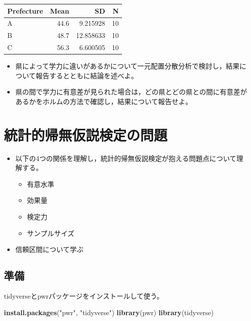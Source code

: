 \documentclass[]{article}
\newenvironment{Shaded}{\begin{snugshade}}{\end{snugshade}}
\newcommand{\KeywordTok}[1]{\textcolor[rgb]{0.13,0.29,0.53}{\textbf{#1}}}
\newcommand{\StringTok}[1]{\textcolor[rgb]{0.31,0.60,0.02}{#1}}
\newcommand{\NormalTok}[1]{#1}
\providecommand{\tightlist}{%
  \setlength{\itemsep}{0pt}\setlength{\parskip}{0pt}}
\begin{document}
\begin{tabular}{l|r|r|r}
\hline
Prefecture & Mean & SD & N\\
\hline
A & 44.6 & 9.215928 & 10\\
\hline
B & 48.7 & 12.858633 & 10\\
\hline
C & 56.3 & 6.600505 & 10\\
\hline
\end{tabular}

\begin{itemize}
\item
  県によって学力に違いがあるかについて一元配置分散分析で検討し，結果について報告するとともに結論を述べよ。
\item
  県の間で学力に有意差が見られた場合は，どの県とどの県との間に有意差があるかをホルムの方法で確認し，結果について報告せよ。
\end{itemize}

\section{統計的帰無仮説検定の問題}

\begin{itemize}
\tightlist
\item
  以下の4つの関係を理解し，統計的帰無仮説検定が抱える問題点について理解する。

  \begin{itemize}
  \tightlist
  \item
    有意水準
  \item
    効果量
  \item
    検定力
  \item
    サンプルサイズ
  \end{itemize}
\item
  信頼区間について学ぶ
\end{itemize}

\subsection{準備}\label{-4}

tidyverseとpwrパッケージをインストールして使う。

\begin{Shaded}
\begin{Highlighting}[]
\KeywordTok{install.packages}\NormalTok{(}\StringTok{"pwr"}\NormalTok{, }\StringTok{"tidyverse"}\NormalTok{)}
\KeywordTok{library}\NormalTok{(pwr)}
\KeywordTok{library}\NormalTok{(tidyverse)}
\end{Highlighting}
\end{Shaded}
\end{document}
